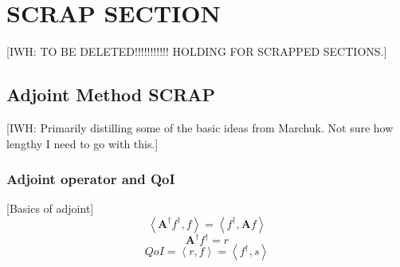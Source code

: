 \documentclass{article}
\newcommand{\bra}{\left\langle}
\newcommand{\ket}{\right\rangle}
\newcommand{\qoi}{QoI}
\begin{document}
\section{SCRAP SECTION}
{\color{red}[IWH: TO BE DELETED!!!!!!!!!!! HOLDING FOR SCRAPPED SECTIONS.]}
\subsection{Adjoint Method SCRAP}
{\color{red}[IWH: Primarily distilling some of the basic ideas from Marchuk. Not sure how lengthy I need to go with this.]}
\subsubsection{Adjoint operator and QoI}
[Basics of adjoint]
\begin{equation}
\bra \mathbf{A^\dag} f^\dag, f \ket = \bra f^\dag, \mathbf{A} f \ket 
\end{equation}
\begin{equation}
\mathbf{A^\dag} f^\dag = r
\end{equation}
\begin{equation}
\qoi = \bra r , f \ket = \bra f^\dag, s \ket 
\end{equation}
\end{document}
